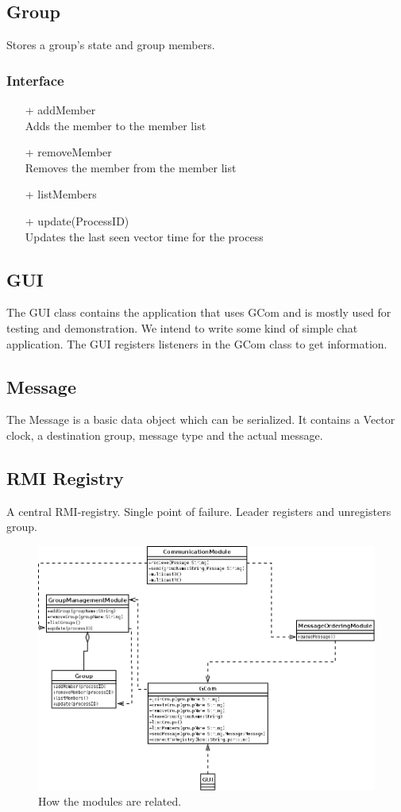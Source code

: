 \documentclass[english]{article}
\begin{document}
\subsection{Group}
Stores a group's state and group members.

\subsubsection{Interface}
\begin{itemize}
\item[+] addMember \\
	Adds the member to the member list
\item[+]  removeMember \\
	Removes the member from the member list
\item[+]  listMembers
\item[+]  update(ProcessID) \\
	Updates the last seen vector time for the process
\end{itemize}


\subsection{GUI}
The GUI class contains the application that uses GCom and is mostly used for testing and demonstration. We intend to write some kind of simple chat application. The GUI registers listeners in the GCom class to get information. 


\subsection{Message}
The Message is a basic data object which can be serialized. It contains a Vector clock, a destination group, message type and the actual message. 

\subsection{RMI Registry}
A central RMI-registry. Single point of failure. Leader registers and unregisters group. 

\begin{figure}[h]
	\includegraphics[width=150mm]{klasser.png}
	\caption{How the modules are related.}
\end{figure}
\end{document}
